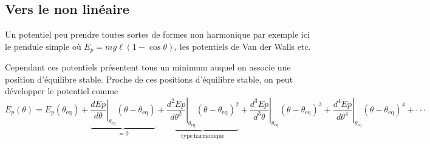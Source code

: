 \documentclass{article}
\begin{document}
\begin{figure}
    \centering
    \hspace{5mm}
\end{figure}

\subsection{Vers le non linéaire}
Un potentiel peu prendre toutes sortes de formes non harmonique par exemple ici le pendule simple où $E_p=mg\ell \left(1-\cos\theta \right)$, les potentiels de Van der Walls etc. 

Cependant ces potentiels présentent tous un minimum auquel on associe une position d'équilibre stable. Proche de ces positions d'équilibre stable, on peut développer le potentiel comme
\begin{equation}
    E_p(\theta) = E_p(\theta_\mathrm{eq}) + \underbrace{\left.\frac{dEp}{d\theta}\right|_{\theta_\mathrm{eq}}\left(\theta-\theta_\mathrm{eq}\right)}_{=0}
    + \underbrace{\left.\frac{d^2Ep}{d\theta^2}\right|_{\theta_\mathrm{eq}}\left(\theta-\theta_\mathrm{eq}\right)^2}_{\mathrm{type~harmonique}}
    + \left.\frac{d^3Ep}{d^3\theta}\right|_{\theta_\mathrm{eq}}\left(\theta-\theta_\mathrm{eq}\right)^3
    + \left.\frac{d^4Ep}{d\theta^4}\right|_{\theta_\mathrm{eq}}\left(\theta-\theta_\mathrm{eq}\right)^4
    +\cdot\cdot\cdot
\end{equation}
\end{document}
